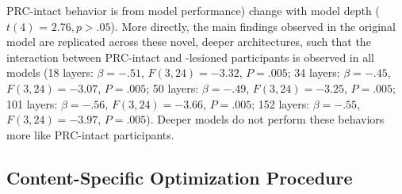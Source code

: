 \documentclass[11pt]{article}
\begin{document}
PRC-intact behavior is from model performance) change with model depth ($t(4)$ = $2.76, p > .05$). More directly, the main findings observed in the original model are replicated across these novel, deeper architectures, such that the interaction between PRC-intact and -lesioned participants is observed in all models (18 layers: $\beta = -.51$,  $F(3, 24) =-3.32$, $P = .005$; 34 layers: $\beta = -.45$,  $F(3, 24) =-3.07$, $P = .005$; 50 layers: $\beta = -.49$,  $F(3, 24) =-3.25$, $P = .005$; 101 layers: $\beta = -.56$,  $F(3, 24) =-3.66$, $P = .005$; 152 layers: $\beta = -.55$,  $F(3, 24) =-3.97$, $P = .005$). Deeper models do not perform these behaviors more like PRC-intact participants. 

\subsection{Content-Specific Optimization Procedure}
\end{document}
